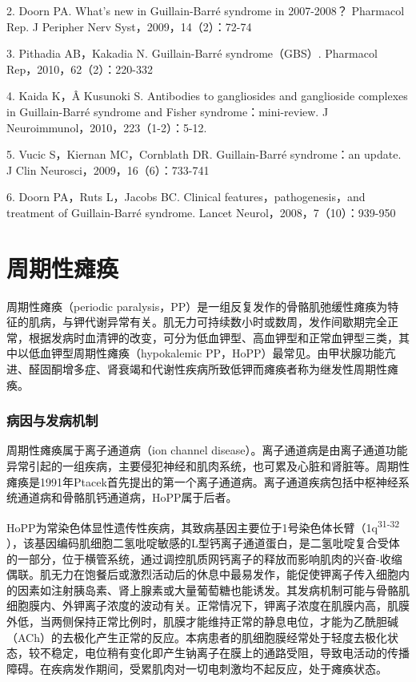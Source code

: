 2. Doorn PA. What's new in Guillain-Barré syndrome in 2007-2008？
Pharmacol Rep. J Peripher Nerv Syst，2009，14（2）：72-74

3. Pithadia AB，Kakadia N. Guillain-Barré syndrome（GBS）. Pharmacol
Rep，2010，62（2）：220-332

4. Kaida K，Â Kusunoki S. Antibodies to gangliosides and ganglioside
complexes in Guillain-Barré syndrome and Fisher syndrome：mini-review. J
Neuroimmunol，2010，223（1-2）：5-12.

5. Vucic S，Kiernan MC，Cornblath DR. Guillain-Barré syndrome：an
update. J Clin Neurosci，2009，16（6）：733-741

6. Doorn PA，Ruts L，Jacobs BC. Clinical features，pathogenesis，and
treatment of Guillain-Barré syndrome. Lancet
Neurol，2008，7（10）：939-950

\protect\hypertarget{text00262.html}{}{}

\chapter{周期性瘫痪}

周期性瘫痪（periodic
paralysis，PP）是一组反复发作的骨骼肌弛缓性瘫痪为特征的肌病，与钾代谢异常有关。肌无力可持续数小时或数周，发作间歇期完全正常，根据发病时血清钾的改变，可分为低血钾型、高血钾型和正常血钾型三类，其中以低血钾型周期性瘫痪（hypokalemic
PP，HoPP）最常见。由甲状腺功能亢进、醛固酮增多症、肾衰竭和代谢性疾病所致低钾而瘫痪者称为继发性周期性瘫痪。

\subsection{病因与发病机制}

周期性瘫痪属于离子通道病（ion channel
disease）。离子通道病是由离子通道功能异常引起的一组疾病，主要侵犯神经和肌肉系统，也可累及心脏和肾脏等。周期性瘫痪是1991年Ptacek首先提出的第一个离子通道病。离子通道疾病包括中枢神经系统通道病和骨骼肌钙通道病，HoPP属于后者。

HoPP为常染色体显性遗传性疾病，其致病基因主要位于1号染色体长臂（1q\textsuperscript{31-32}
），该基因编码肌细胞二氢吡啶敏感的L型钙离子通道蛋白，是二氢吡啶复合受体的一部分，位于横管系统，通过调控肌质网钙离子的释放而影响肌肉的兴奋-收缩偶联。肌无力在饱餐后或激烈活动后的休息中最易发作，能促使钾离子传入细胞内的因素如注射胰岛素、肾上腺素或大量葡萄糖也能诱发。其发病机制可能与骨骼肌细胞膜内、外钾离子浓度的波动有关。正常情况下，钾离子浓度在肌膜内高，肌膜外低，当两侧保持正常比例时，肌膜才能维持正常的静息电位，才能为乙酰胆碱（ACh）的去极化产生正常的反应。本病患者的肌细胞膜经常处于轻度去极化状态，较不稳定，电位稍有变化即产生钠离子在膜上的通路受阻，导致电活动的传播障碍。在疾病发作期间，受累肌肉对一切电刺激均不起反应，处于瘫痪状态。

